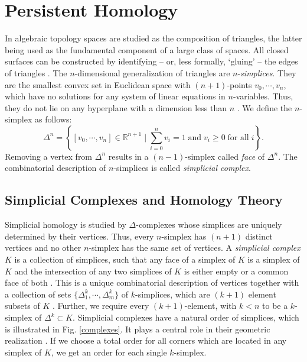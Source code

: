 \documentclass[envcountsect,runningheads]{llncs}
\begin{document}
\section{Persistent Homology}
\label{sec:persistenthomology}
In algebraic topology spaces are studied as the composition of triangles, the latter being used as the fundamental component of a large class of spaces. All closed surfaces can be constructed by identifying -- or, less formally, `gluing' -- the edges of triangles . The $n$-dimensional generalization of triangles are $n$-\emph{simplices}. They are the smallest convex set in Euclidean space with $(n+1)$-points $v_0,\cdots,v_n$, which have no solutions for any system of linear equations in $n$-variables. Thus, they do not lie on any hyperplane with a dimension less than $n$ . We define the $n$-simplex as follows:
\begin{equation}
    \Delta^n = \left\{ [v_0,\cdots,v_n] \in \mathbb{R}^{n+1} \; \bigg\vert \; \sum_{i=0}^{n} v_i = 1 \; \text{and} \; v_i \geq 0 \; \text{for all} \; i \right\}.
\end{equation}
Removing a vertex from $\Delta^n$ results in a $(n-1)$-simplex called \emph{face} of $\Delta^n$. The combinatorial description of $n$-simplices is called \emph{simplicial complex}.

\subsection{Simplicial Complexes and Homology Theory}
\label{simcomplexhomtheory}
Simplicial homology is studied by $\Delta$-complexes whose simplices are uniquely determined by their vertices. Thus, every $n$-simplex has $(n+1)$ distinct vertices and no other $n$-simplex has the same set of vertices. A \emph{simplicial complex} $K$ is a collection of simplices, such that any face of a simplex of $K$ is a simplex of $K$ and the intersection of any two simplices of $K$ is either empty or a common face of both \cite[p.~11]{boissonnat2018geometric}. This is a unique combinatorial description of vertices together with a collection of sets $\{\Delta^k_1, \cdots, \Delta^k_m\}$ of $k$-simplices, which are $(k+1)$ element subsets of $K$ . Further, we require every $(k+1)$-element, with $k < n$ to be a $k$-simplex of $\Delta^k \subset K$. Simplicial complexes have a natural order of simplices, which is illustrated in Fig. \ref{complexes}. It plays a central role in their geometric realization . If we choose a total order for all corners which are located in any simplex of $K$, we get an order for each single $k$-simplex.
\end{document}

